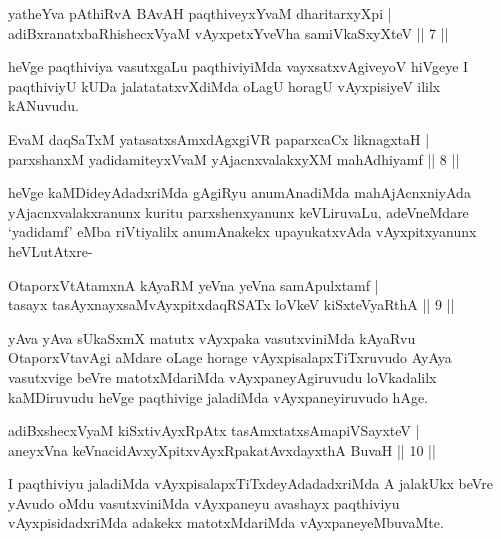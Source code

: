 \begin{shl}
yatheYva pAthiRvA BAvAH paqthiveyxYvaM dharitarxyXpi |\\
adiBxranatxbaRhishecxVyaM vAyxpetxYveVha samiVkaSxyXteV \hfill || 7 ||
\end{shl}

\begin{artha}
heVge paqthiviya vasutxgaLu paqthiviyiMda vayxsatxvAgiveyoV hiVgeye I paqthiviyU kUDa jalatatatxvXdiMda oLagU horagU vAyxpisiyeV ililx kANuvudu.
\end{artha}

\begin{shl}
EvaM daqSaTxM yatasatxsAmxdAgxgiVR paparxcaCx liknagxtaH |\\
parxshanxM yadidamiteyxVvaM yAjacnxvalakxyXM mahAdhiyamf \hfill || 8 ||
\end{shl}

\begin{artha}
heVge kaMDideyAdadxriMda gAgiRyu anumAnadiMda mahAjAcnxniyAda yAjacnxvalakxranunx kuritu parxshenxyanunx  keVLiruvaLu, adeVneMdare `yadidamf' eMba riVtiyalilx anumAnakekx upayukatxvAda vAyxpitxyanunx heVLutAtxre-
\end{artha}


\begin{shl}
OtaporxVtAtamxnA kAyaRM yeVna yeVna samApulxtamf |\\
tasayx tasAyxnayxsaMvAyxpitxdaqRSATx loVkeV kiSxteVyaRthA \hfill || 9 ||
\end{shl}

\begin{artha}
yAva yAva sUkaSxmX matutx vAyxpaka vasutxviniMda kAyaRvu OtaporxVtavAgi aMdare oLage horage vAyxpisalapxTiTxruvudo AyAya vasutxvige beVre matotxMdariMda vAyxpaneyAgiruvudu loVkadalilx kaMDiruvudu heVge paqthivige jaladiMda vAyxpaneyiruvudo hAge. 
\end{artha}

\begin{shl}
adiBxshecxVyaM kiSxtivAyxRpAtx tasAmxtatxsAmapiVSayxteV |\\
aneyxVna keVnacidAvxyXpitxvAyxRpakatAvxdayxthA BuvaH \hfill || 10 ||
\end{shl}

\begin{artha}
I paqthiviyu jaladiMda vAyxpisalapxTiTxdeyAdadadxriMda A jalakUkx beVre yAvudo oMdu vasutxviniMda vAyxpaneyu avashayx paqthiviyu vAyxpisidadxriMda adakekx matotxMdariMda vAyxpaneyeMbuvaMte.
\end{artha}

